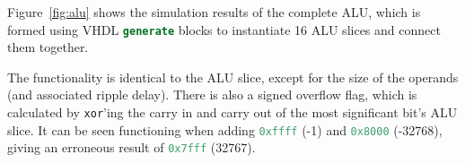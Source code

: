 \documentclass[a4paper]{article}
\numberwithin{figure}{section}
\numberwithin{table}{section}
\newcommand{\mi}{\mintinline}
\begin{document}
Figure~\ref{fig:alu} shows the simulation results of the complete ALU, which is formed
using VHDL \mi{vhdl}{generate} blocks to instantiate 16 ALU slices and connect them together.

The functionality is identical to the ALU slice, except for the size of the operands (and 
associated ripple delay). There is also a signed overflow flag, which is calculated by \mi{c}{xor}'ing 
the carry in and carry out of the most significant bit's ALU slice. It can be seen functioning when
adding \mi{c}{0xffff} (-1) and \mi{c}{0x8000} (-32768), giving an erroneous result of 
\mi{c}{0x7fff} (32767).
\end{document}
